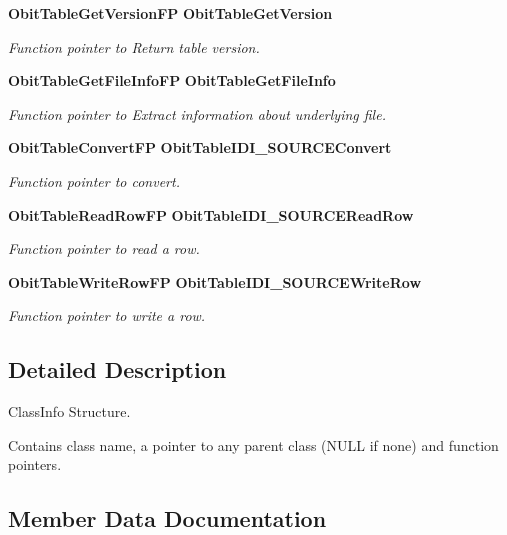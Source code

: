 \begin{CompactItemize}
{\bf Obit\-Table\-Get\-Version\-FP} {\bf Obit\-Table\-Get\-Version}
\begin{CompactList}\small\item\em Function pointer to Return table version. \item\end{CompactList}\item 
{\bf Obit\-Table\-Get\-File\-Info\-FP} {\bf Obit\-Table\-Get\-File\-Info}
\begin{CompactList}\small\item\em Function pointer to Extract information about underlying file. \item\end{CompactList}\item 
{\bf Obit\-Table\-Convert\-FP} {\bf Obit\-Table\-IDI\_\-SOURCEConvert}
\begin{CompactList}\small\item\em Function pointer to convert. \item\end{CompactList}\item 
{\bf Obit\-Table\-Read\-Row\-FP} {\bf Obit\-Table\-IDI\_\-SOURCERead\-Row}
\begin{CompactList}\small\item\em Function pointer to read a row. \item\end{CompactList}\item 
{\bf Obit\-Table\-Write\-Row\-FP} {\bf Obit\-Table\-IDI\_\-SOURCEWrite\-Row}
\begin{CompactList}\small\item\em Function pointer to write a row. \item\end{CompactList}\end{CompactItemize}


\subsection{Detailed Description}
Class\-Info Structure. 

Contains class name, a pointer to any parent class (NULL if none) and function pointers. 



\subsection{Member Data Documentation}

